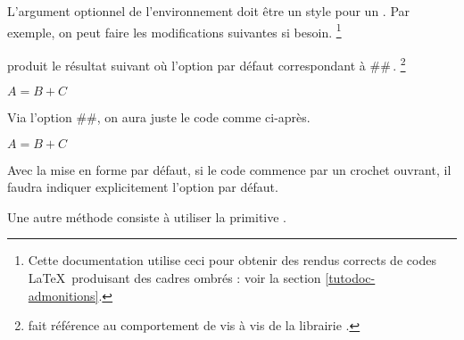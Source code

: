 \documentclass{tutodoc}
\begin{document}
\begin{tdocnote}
	L'argument optionnel de l'environnement  doit être un style pour un . Par exemple, on peut faire les modifications suivantes si besoin.%
	\footnote{
		Cette documentation utilise ceci pour obtenir des rendus corrects de codes \LaTeX\ produisant des cadres ombrés : voir la section \ref{tutodoc-admonitions}.
	}

\end{tdocnote}


\begin{tdocexa}[À la suite]
     produit le résultat suivant où l'option par défaut correspondant à \tdoclatexin##\,.
    \footnote{
         fait référence au comportement  de  vis à vis de la librairie .
    }

    \begin{tdoclatex}
        $A = B + C$
    \end{tdoclatex}
\end{tdocexa}


\begin{tdocexa}
    Via l'option \tdoclatexin##, on aura juste le code comme ci-après.

    \begin{tdoclatex}
        $A = B + C$
    \end{tdoclatex}
\end{tdocexa}


\begin{tdocwarn}
    Avec la mise en forme par défaut, si le code commence par un crochet ouvrant, il faudra indiquer explicitement l'option par défaut.

    \smallskip

    Une autre méthode consiste à utiliser la primitive .
\end{tdocwarn}
\end{document}
